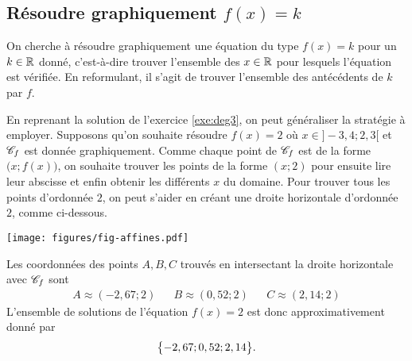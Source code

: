 

\newpage

\subsection{Résoudre graphiquement $f(x) = k$}


On cherche à résoudre graphiquement une équation du type $f(x)=k$ pour un $k\in\mathbb{R}$ donné, c'est-à-dire trouver l'ensemble des $x\in\mathbb{R}$ pour lesquels l'équation est vérifiée.
En reformulant, il s'agit de trouver l'ensemble des antécédents de $k$ par $f$. 

En reprenant la solution de l'exercice \ref{exe:deg3}, on peut généraliser la stratégie à employer.
Supposons qu'on souhaite résoudre $f(x) = 2$ où $x\in]{-}3,4 ; 2,3[$ et $\mathcal{C}_f$ est donnée graphiquement.
Comme chaque point de $\mathcal{C}_f$ est de la forme $\bigl(x; f(x)\bigr)$, on souhaite trouver les points de la forme $(x;2)$ pour ensuite lire leur abscisse et enfin obtenir les différents $x$ du domaine.
Pour trouver tous les points d'ordonnée $2$, on peut s'aider en créant une droite horizontale d'ordonnée $2$, comme ci-dessous.
	\begin{center}
	\texttt{[image: figures/fig-affines.pdf]}
	\end{center}
Les coordonnées des points $A,B,C$ trouvés en intersectant la droite horizontale avec $\mathcal{C}_f$ sont
	\begin{align*}
		A \approx (-2,67 ; 2) && B \approx (0,52 ; 2) && C \approx (2,14 ; 2)
	\end{align*}
L'ensemble de solutions de l'équation $f(x)=2$ est donc approximativement donné par 
	\[ \bigl\{  -2,67 ; 0,52 ; 2,14  \bigr\}. \]

